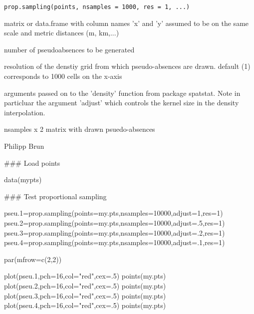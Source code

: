 \documentclass[a4paper]{book}
\begin{document}
%
\begin{Usage}
\begin{verbatim}
prop.sampling(points, nsamples = 1000, res = 1, ...)
\end{verbatim}
\end{Usage}
%
\begin{Arguments}
\begin{ldescription}
\item[\code{points}] matrix or data.frame with column names 'x' and 'y' assumed to
be on the same scale and metric distances (m, km,...)

\item[\code{nsamples}] number of pseudoabsences to be generated

\item[\code{res}] resolution of the denstiy grid from which pseudo-absences are drawn.
default (1) corresponds to 1000 cells on the x-axis

\item[\code{...}] arguments passed on to the 'density' function from package spatstat.
Note in particluar the argument 'adjust' which controls the kernel size in the
density interpolation.
\end{ldescription}
\end{Arguments}
%
\begin{Value}
nsamples x 2 matrix with drawn psuedo-absences
\end{Value}
%
\begin{Author}\relax
Philipp Brun
\end{Author}
%
\begin{Examples}
\begin{ExampleCode}

### Load points

data(mypts)

### Test proportional sampling

pseu.1=prop.sampling(points=my.pts,nsamples=10000,adjust=1,res=1)
pseu.2=prop.sampling(points=my.pts,nsamples=10000,adjust=.5,res=1)
pseu.3=prop.sampling(points=my.pts,nsamples=10000,adjust=.2,res=1)
pseu.4=prop.sampling(points=my.pts,nsamples=10000,adjust=.1,res=1)

par(mfrow=c(2,2))

plot(pseu.1,pch=16,col="red",cex=.5)
points(my.pts)
plot(pseu.2,pch=16,col="red",cex=.5)
points(my.pts)
plot(pseu.3,pch=16,col="red",cex=.5)
points(my.pts)
plot(pseu.4,pch=16,col="red",cex=.5)
points(my.pts)

\end{ExampleCode}
\end{Examples}
\end{document}
